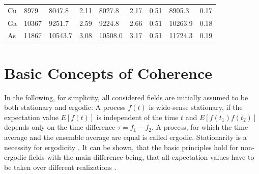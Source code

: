 \begin{table}
\begin{tabular}{l|l|ll|lll|ll}
		Cu      & 8979                                                   & 8047.8                                                & 2.11                                                 & 8027.8                                                & 2.17                                                 & 0.51                                                      & 8905.3                                                & 0.17                                                      \\
		Ga      & 10367                                                  & 9251.7                                                 & 2.59                                                 & 9224.8                                                 & 2.66                                                 & 0.51                                                      & 10263.9                                               & 0.18                                                      \\
		As      & 11867                                                  & 10543.7                                                & 3.08                                                 & 10508.0                                                & 3.17                                                 & 0.51                                                      & 11724.3                                               & 0.19                                                      \\ \hline
	\end{tabular}
\end{table}

\section{Basic Concepts of Coherence}
In the following, for simplicity, all considered fields are initially assumed to be both stationary and ergodic: A process $f(t)$ is wide-sense stationary, if the expectation value $E[f(t)]$ is independent of the time $t$ and $E[f(t_1)f(t_2)]$ depends only on the time difference $\tau=f_1-f_2$. A process, for which the time average and the ensemble average are equal is called ergodic. Stationarity is a necessity for ergodicity \cite{goodman2000}. It can be shown, that the basic principles hold for non-ergodic fields with the main difference being, that all expectation values have to be taken over different realizations  \cite{lajunen04}.

